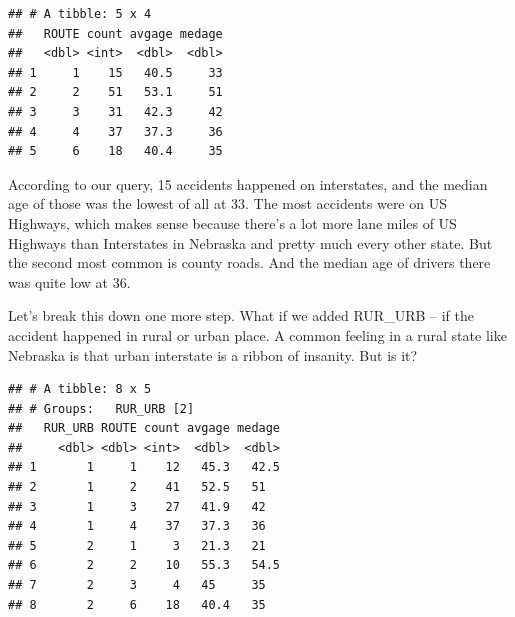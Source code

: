 \documentclass[]{book}
\newenvironment{Shaded}{\begin{snugshade}}{\end{snugshade}}
\newcommand{\DataTypeTok}[1]{\textcolor[rgb]{0.13,0.29,0.53}{#1}}
\newcommand{\DecValTok}[1]{\textcolor[rgb]{0.00,0.00,0.81}{#1}}
\newcommand{\KeywordTok}[1]{\textcolor[rgb]{0.13,0.29,0.53}{\textbf{#1}}}
\newcommand{\NormalTok}[1]{#1}
\newcommand{\OperatorTok}[1]{\textcolor[rgb]{0.81,0.36,0.00}{\textbf{#1}}}
\newcommand{\StringTok}[1]{\textcolor[rgb]{0.31,0.60,0.02}{#1}}
\begin{document}
\begin{verbatim}
## # A tibble: 5 x 4
##   ROUTE count avgage medage
##   <dbl> <int>  <dbl>  <dbl>
## 1     1    15   40.5     33
## 2     2    51   53.1     51
## 3     3    31   42.3     42
## 4     4    37   37.3     36
## 5     6    18   40.4     35
\end{verbatim}

According to our query, 15 accidents happened on interstates, and the median age of those was the lowest of all at 33. The most accidents were on US Highways, which makes sense because there's a lot more lane miles of US Highways than Interstates in Nebraska and pretty much every other state. But the second most common is county roads. And the median age of drivers there was quite low at 36.

Let's break this down one more step. What if we added RUR\_URB -- if the accident happened in rural or urban place. A common feeling in a rural state like Nebraska is that urban interstate is a ribbon of insanity. But is it?

\begin{Shaded}
\end{Shaded}

\begin{verbatim}
## # A tibble: 8 x 5
## # Groups:   RUR_URB [2]
##   RUR_URB ROUTE count avgage medage
##     <dbl> <dbl> <int>  <dbl>  <dbl>
## 1       1     1    12   45.3   42.5
## 2       1     2    41   52.5   51  
## 3       1     3    27   41.9   42  
## 4       1     4    37   37.3   36  
## 5       2     1     3   21.3   21  
## 6       2     2    10   55.3   54.5
## 7       2     3     4   45     35  
## 8       2     6    18   40.4   35
\end{verbatim}
\end{document}
